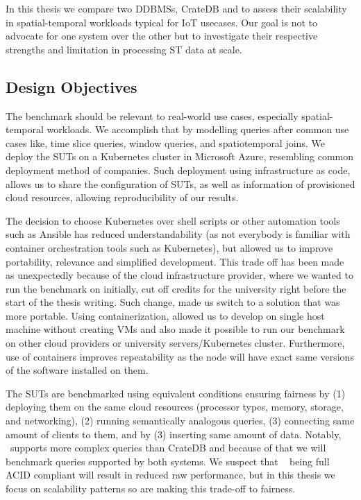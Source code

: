 
In this thesis we compare two DDBMSs, CrateDB and \mobilitydbc to assess their scalability in spatial-temporal workloads typical for IoT usecases.
Our goal is not to advocate for one system over the other but to investigate their respective strengths and limitation in processing ST data at scale.

\subsection{Design Objectives}
The benchmark should be relevant to real-world use cases, especially spatial-temporal workloads.
We accomplish that by modelling queries after common use cases like, time slice queries, window queries, and spatiotemporal joins.
We deploy the SUTs on a Kubernetes cluster in Microsoft Azure, resembling common deployment method of companies.
Such deployment using infrastructure as code, allows us to share the configuration of SUTs, as well as information of provisioned cloud resources, allowing reproducibility of our results.

The decision to choose Kubernetes over shell scripts or other automation tools such as Ansible has reduced understandability (as not everybody is familiar with container orchestration tools such as Kubernetes), but allowed us to improve portability, relevance and simplified development.
This trade off has been made as unexpectedly because of the cloud infrastructure provider, where we wanted to run the benchmark on initially, cut off credits for the university right before the start of the thesis writing.
Such change, made us switch to a solution that was more portable.
Using containerization, allowed us to develop on single host machine without creating VMs and also made it possible to run our benchmark on other cloud providers or university servers/Kubernetes cluster.
Furthermore, use of containers improves repeatability as the node will have exact same versions of the software installed on them.

The SUTs are benchmarked using equivalent conditions ensuring fairness by
(1) deploying them on the same cloud resources (processor types, memory, storage, and networking),
(2) running semantically analogous queries,
(3) connecting same amount of clients to them, and by
(3) inserting same amount of data.
Notably, \mobilitydbc~supports more complex queries than CrateDB and because of that we will benchmark queries supported by both systems.
We suspect that \mobilitydbc~ being full ACID compliant will result in reduced raw performance, but in this thesis we focus on scalability patterns so are making this trade-off to fairness.

